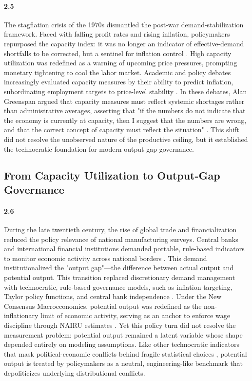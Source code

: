 \paragraph{2.5}
The stagflation crisis of the 1970s dismantled the post-war demand-stabilization framework. Faced with falling profit rates and rising inflation, policymakers repurposed the capacity index: it was no longer an indicator of effective-demand shortfalls to be corrected, but a sentinel for inflation control \citep{ShaikhManiatisPetralias1999}. High capacity utilization was redefined as a warning of upcoming price pressures, prompting monetary tightening to cool the labor market. Academic and policy debates increasingly evaluated capacity measures by their ability to predict inflation, subordinating employment targets to price-level stability \citep{KleinEtAl1973}. In these debates, Alan Greenspan argued that capacity measures must reflect systemic shortages rather than administrative averages, asserting that "if the numbers do not indicate that the economy is currently at capacity, then I suggest that the numbers are wrong, and that the correct concept of capacity must reflect the situation" \citep[p.~758]{KleinEtAl1973}. This shift did not resolve the unobserved nature of the productive ceiling, but it established the technocratic foundation for modern output-gap governance.

\subsection{From Capacity Utilization to Output-Gap Governance}
\label{subsec:output_gap_governance}

\paragraph{2.6}
During the late twentieth century, the rise of global trade and financialization reduced the policy relevance of national manufacturing surveys. Central banks and international financial institutions demanded portable, rule-based indicators to monitor economic activity across national borders \citep{Jessop2002, Jessop2003, Konings2007}. This demand institutionalized the "output gap"---the difference between actual output and potential output. This transition replaced discretionary demand management with technocratic, rule-based governance models, such as inflation targeting, Taylor policy functions, and central bank independence \citep{Taylor1993, Johnson2024}. Under the New Consensus Macroeconomics, potential output was redefined as the non-inflationary limit of economic activity, serving as an anchor to enforce wage discipline through NAIRU estimates \citep{SaadFilho2018}. Yet this policy turn did not resolve the measurement problem: potential output remained a latent variable whose shape depended entirely on modeling assumptions. Like other technocratic indicators that mask political-economic conflicts behind fragile statistical choices \citep{HerndonAshPollin2014, AshBasuDube2017}, potential output is treated by policymakers as a neutral, engineering-like benchmark that depoliticizes underlying distributional conflicts.

